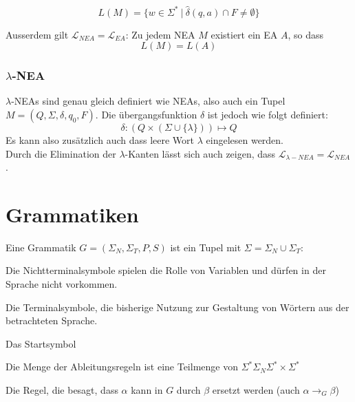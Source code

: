\documentclass[11pt]{article}
\begin{document}
\begin{equation*}
	L(M) = \{w \in \Sigma^*\ |\ \hat\delta(q, a) \cap F \neq \emptyset\}
\end{equation*}

Ausserdem gilt $\mathcal{L}_{NEA} = \mathcal{L}_{EA}$: Zu jedem NEA $M$ existiert ein EA $A$, so dass
\begin{equation*}
	L(M) = L(A)
\end{equation*}

\subsubsection{$\lambda$-NEA}

$\lambda$-NEAs sind genau gleich definiert wie NEAs, also auch ein Tupel $M = (Q, \Sigma, \delta, q_0, F)$. Die {\"u}bergangsfunktion $\delta$ ist jedoch wie folgt definiert:
\begin{equation*}
	\delta: (Q\times(\Sigma \cup \{\lambda\})) \mapsto Q
\end{equation*}
Es kann also zus{\"a}tzlich auch dass leere Wort $\lambda$ eingelesen werden. \\

Durch die Elimination der $\lambda$-Kanten l{\"a}sst sich auch zeigen, dass $\mathcal{L}_{\lambda-NEA} = \mathcal{L}_{NEA}$.

\section{Grammatiken}

Eine Grammatik $G = (\Sigma_N, \Sigma_T, P, S)$ ist ein Tupel mit $\Sigma = \Sigma_N \cup \Sigma_T$:

\begin{description}[labelindent=16pt,style=multiline,leftmargin=3cm, noitemsep]
	\item[$\Sigma_N$:] Die Nichtterminalsymbole spielen die Rolle von Variablen und d{\"u}rfen in der Sprache nicht vorkommen.
	\item[$\Sigma_T$:] Die Terminalsymbole, die bisherige Nutzung zur Gestaltung von Wörtern aus der betrachteten Sprache.
	\item[$S \in \Sigma_N$:] Das Startsymbol
	\item[$P$:] Die Menge der Ableitungsregeln ist eine Teilmenge von $\Sigma^*\Sigma_N\Sigma^* \times \Sigma^*$
	\item[$(\alpha, \beta) \in P$:] Die Regel, die besagt, dass $\alpha$ kann in $G$ durch $\beta$ ersetzt werden (auch $\alpha \rightarrow_G \beta$)
\end{description}
\end{document}
